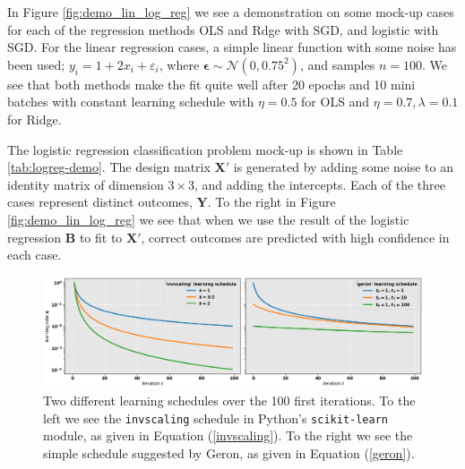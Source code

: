 \documentclass[]{article}
\begin{document}
\vspace{5mm}

In Figure \ref{fig:demo_lin_log_reg} we see a demonstration on some mock-up cases for each of the regression methods OLS and Rdge with SGD, and logistic with SGD. For the linear regression cases, a simple linear function with some noise has been used; $y_i = 1 + 2x_i + \varepsilon_i$, where $\mathbf{\epsilon} \sim \mathcal{N}(0, 0.75^2)$, and samples $n=100$. We see that both methods make the fit quite well after 20 epochs and 10 mini batches with constant learning schedule with $\eta = 0.5$ for OLS and $\eta = 0.7, \lambda=0.1$ for Ridge.

The logistic regression classification problem mock-up is shown in Table \ref{tab:logreg-demo}. The design matrix $\mathbf{X}'$ is generated by adding some noise to an identity matrix of dimension $3 \times 3$, and adding the intercepts. Each of the three cases represent distinct outcomes, $\mathbf{Y}$. To the right in Figure \ref{fig:demo_lin_log_reg} we see that when we use the result of the logistic regression $\mathbf{B}$ to fit to $\mathbf{X}'$, correct outcomes are predicted with high confidence in each case.

\begin{figure}[!htb]
	\centering
	\includegraphics[width=1\linewidth]{learning_schedules.png}
	\caption{Two different learning schedules over the 100 first iterations. To the left we see the \lstinline|invscaling| schedule in Python's \lstinline|scikit-learn| module, as given in Equation (\ref{invscaling}). To the right we see the simple schedule suggested by Geron, as given in Equation (\ref{geron}).}
	\label{fig:learning_schedules}
\end{figure}
\end{document}
